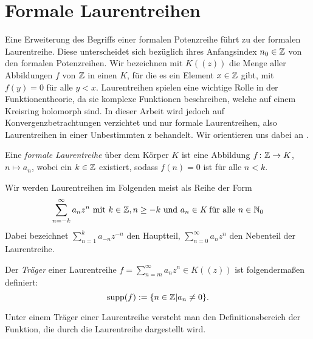 \section{Formale Laurentreihen}
%
Eine Erweiterung des Begriffs einer formalen Potenzreihe führt zu der formalen Laurentreihe. Diese unterscheidet sich bezüglich ihres Anfangsindex $n_0 \in \mathbb{Z}$ von den formalen Potenzreihen. Wir bezeichnen mit $K((z))$ die Menge aller Abbildungen $f$ von $\mathbb{Z}$ in einen $K$, für die es ein Element $x \in \mathbb{Z}$ gibt, mit $f(y) = 0$ für alle $y < x $. \newline 
Laurentreihen spielen eine wichtige Rolle in der Funktionentheorie, da sie komplexe Funktionen beschreiben, welche auf einem Kreisring holomorph sind. In dieser Arbeit wird jedoch auf Konvergenzbetrachtungen verzichtet und nur formale Laurentreihen, also Laurentreihen in einer Unbestimmten z behandelt. %
Wir orientieren uns dabei an \cite[S. 563 - 572]{Lueneburg08}.
%
\begin{defn}
Eine \textit{formale Laurentreihe} über dem Körper $K$ ist eine Abbildung $f \colon \mathbb{Z} \rightarrow K$, $n \mapsto a_n$, wobei ein $k\in \mathbb{Z}$ existiert, sodass $f(n) = 0$ ist für alle $n < k$.
\end{defn}
%
%
\begin{nota}
Wir werden Laurentreihen im Folgenden meist als Reihe der Form
\begin{equation*}
\sum_{n= - k}^{\infty}a_nz^n \text{ mit } k \in \mathbb{Z}, n \ge -k \text{ und }a_n \in\textit{K}\text{ für alle } n\in\mathbb{N}_0 
\end{equation*} 
Dabei bezeichnet $\sum_{n=1}^{k}a_{-n}z^{-n}$ den Hauptteil, $\sum_{n=0}^{\infty}a_nz^n$ den Nebenteil der Laurentreihe. 
\end{nota}
%
%
%
%
%
%
%
%
%
%
% 
\begin{defn}\label{traeger}
Der \textit{Träger} einer Laurentreihe $f = \sum_{n =m}^{\infty} a_nz^n \in K((z))$ ist folgendermaßen definiert: 
\[\text{supp}(f) := \lbrace n \in \mathbb{Z} | a_n \neq 0 \rbrace.\] 
\end{defn}
%
%
%
%
\begin{bem}
Unter einem Träger einer Laurentreihe versteht man den Definitionsbereich der Funktion, die durch die Laurentreihe dargestellt wird.
\end{bem}
%
%
%
%
